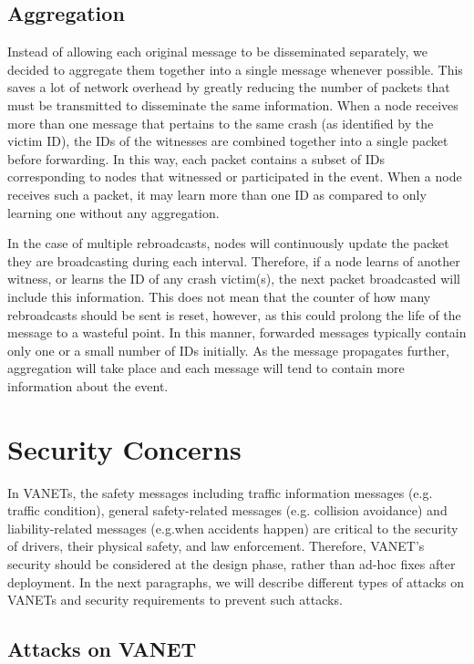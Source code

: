 \documentclass{IEEEtran}
\begin{document}
\subsection{Aggregation}

Instead of allowing each original message to be disseminated separately, we decided to aggregate them together into a single message whenever possible.
This saves a lot of network overhead by greatly reducing the number of packets that must be transmitted to disseminate the same information.
When a node receives more than one message that pertains to the same crash (as identified by the victim ID), the IDs of the witnesses are combined together into a single packet before forwarding.
In this way, each packet contains a subset of IDs corresponding to nodes that witnessed or participated in the event.
When a node receives such a packet, it may learn more than one ID as compared to only learning one without any aggregation.

In the case of multiple rebroadcasts, nodes will continuously update the packet they are broadcasting during each interval.
Therefore, if a node learns of another witness, or learns the ID of any crash victim(s), the next packet broadcasted will include this information.
This does not mean that the counter of how many rebroadcasts should be sent is reset, however, as this could prolong the life of the message to a wasteful point.
In this manner, forwarded messages typically contain only one or a small number of IDs initially.
As the message propagates further, aggregation will take place and each message will tend to contain more information about the event.

\section{Security Concerns}

In VANETs, the safety messages including traffic information messages (e.g. traffic condition), general safety-related messages (e.g. collision avoidance) and liability-related messages (e.g.when accidents happen) are critical to the security of drivers, their physical safety, and law enforcement. Therefore, VANET’s security should be considered at the design phase, rather than ad-hoc fixes after deployment. In the next paragraphs, we will describe different types of attacks on VANETs \cite{SecurityVANET, SecurityWSN} and security requirements to prevent such attacks.

\subsection{Attacks on VANET}
\end{document}
